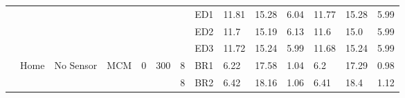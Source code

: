 {\begin{minipage}{\linewidth}
\begin{tabular}{l|l|l|l|c|c|r|l|lll|lll}
                                              &                                          &                                           &                                           &                                            &                                                                                         &                                                                                                & ED1                                       & 11.81 & 15.28 & 6.04      & 11.77 & 15.28 & 5.99       \\
                                              &                                          &                                           &                                           &                                            &                                                                                         &                                                                                                & ED2                                       & 11.7  & 15.19 & 6.13      & 11.6  & 15.0  & 5.99       \\
                                              &                                          &                                           &                                           &                                            &                                                                                         &                                                                                                & ED3                                       & 11.72 & 15.24 & 5.99      & 11.68 & 15.24 & 5.99       \\
  \cline{2-14}
                                              & \multirow{32}{*}{Home}                   & \multirow{16}{*}{No Sensor}               & \multirow{8}{*}{MCM}                      & \multirow{16}{*}{0}                        & \multirow{32}{*}{300}                                                                   & 8                                                                                              & BR1                                       & 6.22  & 17.58 & 1.04      & 6.2   & 17.29 & 0.98       \\
                                              &                                          &                                           &                                           &                                            &                                                                                         & 8                                                                                              & BR2                                       & 6.42  & 18.16 & 1.06      & 6.41  & 18.4  & 1.12       \\

\end{tabular}
\end{minipage}}
